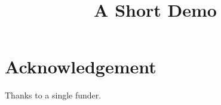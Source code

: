 \documentclass[article]{jss}
\title{A Short Demo}
\begin{document}
\section*{Acknowledgement}
Thanks to a single funder.
\end{document}
